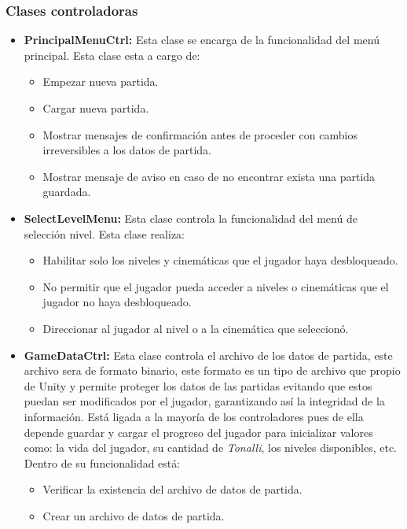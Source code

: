 \subsubsection{Clases controladoras} \label{ClaseCtrl}
		\begin{itemize}
			\item \textbf{PrincipalMenuCtrl:} Esta clase se encarga de la funcionalidad del menú 
			principal. Esta clase esta a cargo de:
			\begin{itemize}
				\item Empezar nueva partida.
				\item Cargar nueva partida.
				\item Mostrar mensajes de confirmación antes de proceder con cambios 
				irreversibles a los datos de partida.
				\item Mostrar mensaje de aviso en caso de no encontrar exista una partida 
				guardada. 
			\end{itemize}
			\item \textbf{SelectLevelMenu:} Esta clase controla la funcionalidad del menú de 
			selección nivel. Esta clase realiza:
			\begin{itemize}
				\item Habilitar solo los niveles y cinemáticas que el jugador haya 
				desbloqueado.
				\item No permitir que el jugador pueda acceder a niveles o cinemáticas 
				que el jugador no haya desbloqueado.
				\item Direccionar al jugador al nivel o a la cinemática que seleccionó.
			\end{itemize}
			\item \textbf{GameDataCtrl:} Esta clase controla el archivo de los datos de 
			partida, este archivo sera de formato binario, este formato es un tipo de 
			archivo que propio de Unity y permite proteger los datos de las partidas evitando
			que estos puedan ser modificados por el jugador, garantizando así la integridad 
			de la información. Está ligada a la mayoría de los controladores pues de ella depende 
			 guardar y cargar el progreso del jugador para inicializar valores como: la 
			 vida del jugador, su cantidad de \textit{Tonalli}, los niveles disponibles, etc. 
			 Dentro de su funcionalidad está: 
			\begin{itemize}
				\item Verificar la existencia del archivo de datos de partida.
				\item Crear un archivo de datos de partida.

\end{itemize}
\end{itemize}
